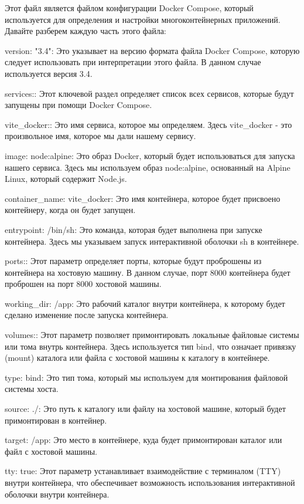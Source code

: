 \documentclass[14pt, a4paper]{extarticle}
\begin{document}
Этот файл является файлом конфигурации Docker Compose, который используется для определения и настройки многоконтейнерных приложений. Давайте разберем каждую часть этого файла:

version: "3.4": Это указывает на версию формата файла Docker Compose, которую следует использовать при интерпретации этого файла. В данном случае используется версия 3.4.

services:: Этот ключевой раздел определяет список всех сервисов, которые будут запущены при помощи Docker Compose.

vite\_docker:: Это имя сервиса, которое мы определяем. Здесь vite\_docker - это произвольное имя, которое мы дали нашему сервису.

image: node:alpine: Это образ Docker, который будет использоваться для запуска нашего сервиса. Здесь мы используем образ node:alpine, основанный на Alpine Linux, который содержит Node.js.

container\_name: vite\_docker: Это имя контейнера, которое будет присвоено контейнеру, когда он будет запущен.

entrypoint: /bin/sh: Это команда, которая будет выполнена при запуске контейнера. Здесь мы указываем запуск интерактивной оболочки sh в контейнере.

ports:: Этот параметр определяет порты, которые будут проброшены из контейнера на хостовую машину. В данном случае, порт 8000 контейнера будет проброшен на порт 8000 хостовой машины.

working\_dir: /app: Это рабочий каталог внутри контейнера, к которому будет сделано изменение после запуска контейнера.

volumes:: Этот параметр позволяет примонтировать локальные файловые системы или тома внутрь контейнера. Здесь используется тип bind, что означает привязку (mount) каталога или файла с хостовой машины к каталогу в контейнере.

type: bind: Это тип тома, который мы используем для монтирования файловой системы хоста.

source: ./: Это путь к каталогу или файлу на хостовой машине, который будет примонтирован в контейнер.

target: /app: Это место в контейнере, куда будет примонтирован каталог или файл с хостовой машины.

tty: true: Этот параметр устанавливает взаимодействие с терминалом (TTY) внутри контейнера, что обеспечивает возможность использования интерактивной оболочки внутри контейнера.
\end{document}
